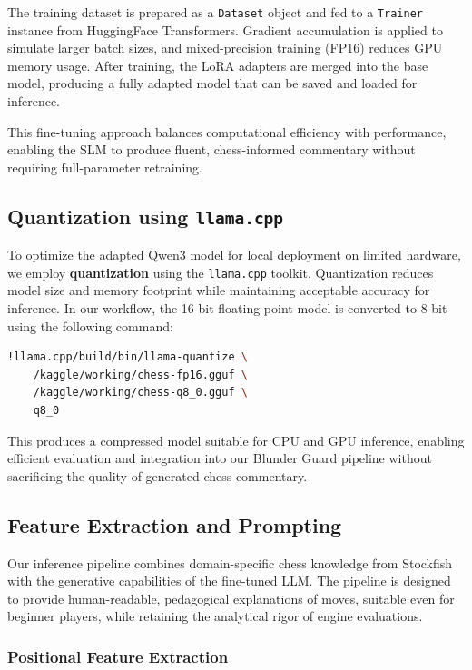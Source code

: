 \documentclass[sigconf,nonacm]{acmart}
\begin{document}
The training dataset is prepared as a \texttt{Dataset} object and fed to a \texttt{Trainer} instance from HuggingFace Transformers. Gradient accumulation is applied to simulate larger batch sizes, and mixed-precision training (FP16) reduces GPU memory usage. After training, the LoRA adapters are merged into the base model, producing a fully adapted model that can be saved and loaded for inference.

This fine-tuning approach balances computational efficiency with performance, enabling the SLM to produce fluent, chess-informed commentary without requiring full-parameter retraining.

\subsection{Quantization using \texttt{llama.cpp}}

To optimize the adapted Qwen3 model for local deployment on limited hardware, we employ \textbf{quantization} using the \texttt{llama.cpp} toolkit. Quantization reduces model size and memory footprint while maintaining acceptable accuracy for inference. In our workflow, the 16-bit floating-point model is converted to 8-bit using the following command:

\begin{lstlisting}[language=bash]
!llama.cpp/build/bin/llama-quantize \
    /kaggle/working/chess-fp16.gguf \
    /kaggle/working/chess-q8_0.gguf \
    q8_0
\end{lstlisting}

This produces a compressed model suitable for CPU and GPU inference, enabling efficient evaluation and integration into our Blunder Guard pipeline without sacrificing the quality of generated chess commentary.

\subsection{Feature Extraction and Prompting}

Our inference pipeline combines domain-specific chess knowledge from Stockfish with the generative capabilities of the fine-tuned LLM. The pipeline is designed to provide human-readable, pedagogical explanations of moves, suitable even for beginner players, while retaining the analytical rigor of engine evaluations.

\subsubsection{Positional Feature Extraction}
\end{document}
